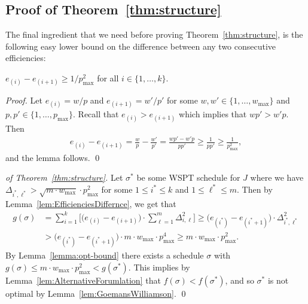 \documentclass[11pt]{llncs}
\begin{document}
\subsection{Proof of Theorem~\ref{thm:structure}}

The final ingredient that we need before proving Theorem~\ref{thm:structure}, is the following easy lower bound on the difference between any two consecutive efficiencies:
\begin{lemma}
\label{lem:EfficienciesDiffernce}%
$e_{(i)}-e_{(i+1)} \geq 1/p_{\max}^2$ for all $i \in \{1,\ldots,k\}$.
\end{lemma}

\begin{proof}
Let $e_{(i)} = w/p$ and $e_{(i+1)} = w'/p'$ for some $w, w' \in \{1,\ldots,w_{\max}\}$ and $p, p' \in \{1,\ldots,p_{\max}\}$. Recall that $e_{(i)} > e_{(i+1)}$ which implies that $wp' > w'p$. Then 
\begin{align*}
e_{(i)}-e_{(i+1)} =\frac{w}{p} - \frac{w'}{p'} = \frac{wp' - w'p}{pp'} \ge \frac{1}{pp'} \ge \frac{1}{p_{\max}^2}, 
\end{align*}
and the lemma follows. \qed
\end{proof}


\begin{proof}[of Theorem~\ref{thm:structure}]
Let $\sigma^*$ be some WSPT schedule for $J$ where we have $\Delta_{i^*,\ell^*} >  \sqrt{m\cdot w_{\max}} \cdot p_{\max}^2$ for some $1 \leq i^* \leq k$ and $1 \leq \ell^* \leq m$. Then by Lemma~\ref{lem:EfficienciesDiffernce}, we get that
\begin{align*}
g(\sigma) &= \sum_{i = 1}^{k}  \Big[ \big(e_{(i)}-e_{(i+1)}\big)  \cdot \sum^{m}_{\ell=1} \Delta^2_{i,\ell} \Big] \geq \big(e_{(i^*)}-e_{(i^*+1)}\big) \cdot \Delta^2_{i^*,\ell^*} \\ 
& >   \big(e_{(i^*)}-e_{(i^*+1)}\big) \cdot m \cdot w_{\max} \cdot p^4_{\max} \geq  m\cdot w_{\max} \cdot p^2_{\max}.
\end{align*}
By Lemma~\ref{lemma:opt-bound} there exists a schedule $\sigma$ with $g(\sigma) \leq m \cdot w_{\max} \cdot p^2_{\max} < g(\sigma^*)$. This implies by Lemma~\ref{lem:AlternativeForumlation} that $f(\sigma) < f(\sigma^*)$, and so $\sigma^*$ is not optimal by Lemma~\ref{lem:GoemansWilliamson}. \qed
\end{proof}
\end{document}
